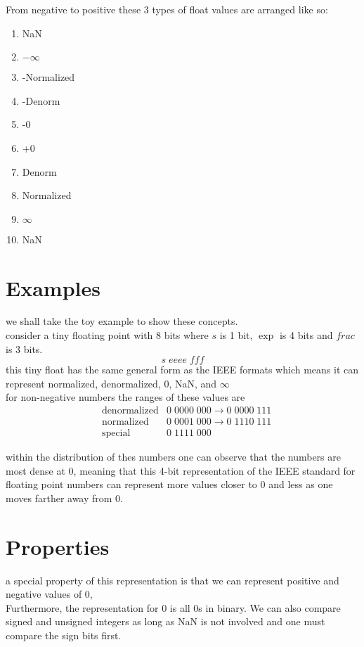 \documentclass[12pt]{book}
\begin{document}
From negative to positive these 3 types of float values are arranged like so:
\begin{enumerate}
        \item NaN
        \item $-\infty$
        \item -Normalized
        \item -Denorm
        \item -0
        \item +0
        \item Denorm
        \item Normalized
        \item $\infty$
        \item NaN
\end{enumerate}


\section*{Examples}
we shall take the toy example to show these concepts.\\
consider a tiny floating point with 8 bits where $s$ is 1 bit,  $\exp$ is 4 bits and $frac$ is 3 bits.
\[s\;eeee\;fff\]
this tiny float has the same general form as the IEEE formats which means it can represent normalized,
denormalized, 0, NaN, and $\infty$\\
for non-negative numbers the ranges of these values are
\begin{align*}
        &\text{denormalized}    &0\;0000\;000\rightarrow 0\;0000\;111\\
        &\text{normalized}  &0\;0001\;000\rightarrow 0\;1110\;111\\
        &\text{special} &0\;1111\;000
\end{align*}

within the distribution of thes numbers one can observe that the numbers are most dense at 0, 
        meaning that this 4-bit representation of the IEEE standard for floating point numbers can 
        represent more values closer to 0 and less as one moves farther away from 0.


\section*{Properties}
a special property of this representation is that we can represent positive and negative values of 0,\\
Furthermore, the representation for 0 is all 0s in binary.
We can also compare signed and unsigned integers as long as NaN is not involved and one must compare the
        sign bits first.
\end{document}
